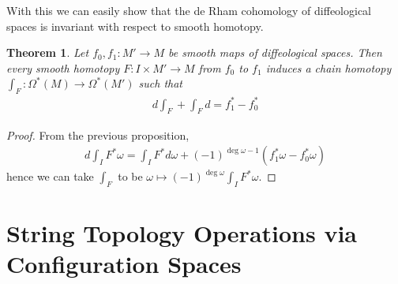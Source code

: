 \documentclass{scrartcl}
\theoremstyle{plain}
\newtheorem{theorem}{Theorem}[section]
\theoremstyle{definition}
\newtheorem{definition}[theorem]{Definition}
\begin{document}
With this we can easily show that the de Rham cohomology of diffeological spaces is invariant with respect to smooth homotopy.
\begin{theorem}
    Let $f_0, f_1\colon M'\to M$ be smooth maps of diffeological spaces. Then every smooth homotopy $F\colon I\times M'\to M$ from $f_0$ to $f_1$ induces a chain homotopy $\int_F\colon \Omega^*(M)\to \Omega^*(M')$ such that 
    \begin{align*}
        d\int_F + \int_F d = f_1^* - f_0^*
    \end{align*}
\end{theorem}
\begin{proof}
    From the previous proposition,
    \begin{align*}
        d \int_I F^*\omega = \int_I F^*d\omega + (-1)^{\deg\omega - 1} (f_1^*\omega - f_0^*\omega)
    \end{align*}
    hence we can take $\int_F$ to be $\omega\mapsto (-1)^{\deg\omega}\int_I F^*\omega$.
\end{proof}









\section{String Topology Operations via Configuration Spaces}
\end{document}
